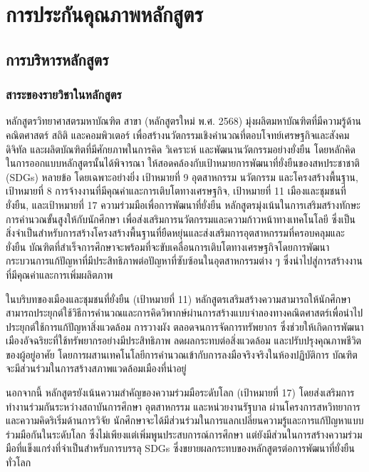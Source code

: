\chapter{การประกันคุณภาพหลักสูตร}
\section{การบริหารหลักสูตร}
\subsection{สาระของรายวิชาในหลักสูตร}
หลักสูตรวิทยาศาสตรมหาบัณฑิต สาขา\thdegreebranch{} (หลักสูตรใหม่ พ.ศ. 2568) มุ่งผลิตมหาบัณฑิตที่มีความรู้ด้านคณิตศาสตร์ สถิติ และคอมพิวเตอร์ เพื่อสร้างนวัตกรรมเชิงคำนวณที่ตอบโจทย์เศรษฐกิจและสังคมดิจิทัล และผลิตบัณฑิตที่มีศักยภาพในการคิด วิเคราะห์ และพัฒนานวัตกรรมอย่างยั่งยืน โดยหลักคิดในการออกแบบหลักสูตรนั้นได้พิจารณา
ให้สอดคล้องกับเป้าหมายการพัฒนาที่ยั่งยืนของสหประชาชาติ (SDGs) หลายข้อ โดยเฉพาะอย่างยิ่ง เป้าหมายที่ 9 อุตสาหกรรม นวัตกรรม และโครงสร้างพื้นฐาน, เป้าหมายที่ 8 การจ้างงานที่มีคุณค่าและการเติบโตทางเศรษฐกิจ, เป้าหมายที่ 11 เมืองและชุมชนที่ยั่งยืน, และเป้าหมายที่ 17 ความร่วมมือเพื่อการพัฒนาที่ยั่งยืน หลักสูตรมุ่งเน้นในการเสริมสร้างทักษะการคำนวณขั้นสูงให้กับนักศึกษา เพื่อส่งเสริมการนวัตกรรมและความก้าวหน้าทางเทคโนโลยี ซึ่งเป็นสิ่งจำเป็นสำหรับการสร้างโครงสร้างพื้นฐานที่ยืดหยุ่นและส่งเสริมการอุตสาหกรรมที่ครอบคลุมและยั่งยืน บัณฑิตที่สำเร็จการศึกษาจะพร้อมที่จะขับเคลื่อนการเติบโตทางเศรษฐกิจโดยการพัฒนากระบวนการแก้ปัญหาที่มีประสิทธิภาพต่อปัญหาที่ซับซ้อนในอุตสาหกรรมต่าง ๆ ซึ่งนำไปสู่การสร้างงานที่มีคุณค่าและการเพิ่มผลิตภาพ

ในบริบทของเมืองและชุมชนที่ยั่งยืน (เป้าหมายที่ 11) หลักสูตรเสริมสร้างความสามารถให้นักศึกษาสามารถประยุกต์ใช้วิธีการคำนวณและการคิดวิพากษ์ผ่านการสร้างแบบจำลองทางคณิตศาสตร์เพื่อนำไปประยุกต์ใช้การแก้ปัญหาสิ่งแวดล้อม การวางผัง ตลอดจนการจัดการทรัพยากร ซึ่งช่วยให้เกิดการพัฒนาเมืองอัจฉริยะที่ใช้ทรัพยากรอย่างมีประสิทธิภาพ ลดผลกระทบต่อสิ่งแวดล้อม และปรับปรุงคุณภาพชีวิตของผู้อยู่อาศัย โดยการผสานเทคโนโลยีการคำนวณเข้ากับการลงมือจริงจริงในห้องปฏิบัติการ บัณฑิตจะมีส่วนร่วมในการสร้างสภาพแวดล้อมเมืองที่น่าอยู่

นอกจากนี้ หลักสูตรยังเน้นความสำคัญของความร่วมมือระดับโลก (เป้าหมายที่ 17) โดยส่งเสริมการทำงานร่วมกันระหว่างสถาบันการศึกษา อุตสาหกรรม และหน่วยงานรัฐบาล ผ่านโครงการสหวิทยาการและความคิดริเริ่มด้านการวิจัย นักศึกษาจะได้มีส่วนร่วมในการแลกเปลี่ยนความรู้และการแก้ปัญหาแบบร่วมมือกันในระดับโลก ซึ่งไม่เพียงแต่เพิ่มพูนประสบการณ์การศึกษา แต่ยังมีส่วนในการสร้างความร่วมมือที่แข็งแกร่งที่จำเป็นสำหรับการบรรลุ SDGs ซึ่งขยายผลกระทบของหลักสูตรต่อการพัฒนาที่ยั่งยืนทั่วโลก

